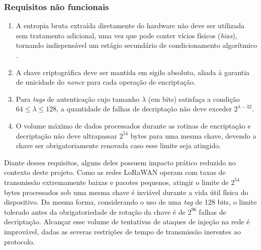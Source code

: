 \subsubsection{Requisitos não funcionais}

\begin{enumerate}
    \item[RNF1.] A entropia bruta extraída diretamente do hardware não deve ser utilizada sem tratamento adicional, uma vez que pode conter vícios físicos (\textit{bias}), tornando indispensável um estágio secundário de condicionamento algorítmico \cite{turan2018nist90b}.

    \item[RNF2.] A chave criptográfica deve ser mantida em sigilo absoluto, aliada à garantia de unicidade do \textit{nonce} para cada operação de encriptação.

    \item[RNF3.] Para \textit{tags} de autenticação cujo tamanho $\lambda$ (em bits) satisfaça a condição $64 \leq \lambda \leq 128$, a quantidade de falhas de decriptação não deve exceder $2^{\lambda - 32}$.

    \item[RNF4.] O volume máximo de dados processados durante as rotinas de encriptação e decriptação não deve ultrapassar $2^{54}$ bytes para uma mesma chave, devendo a chave ser obrigatoriamente renovada caso esse limite seja atingido.
\end{enumerate}

Diante desses requisitos, alguns deles possuem impacto prático reduzido no contexto deste projeto. Como as redes LoRaWAN operam com taxas de transmissão extremamente baixas e pacotes pequenos, atingir o limite de $2^{54}$ bytes processados sob uma mesma chave é inviável durante a vida útil física do dispositivo. Da mesma forma, considerando o uso de uma \textit{tag} de 128 bits, o limite tolerado antes da obrigatoriedade de rotação da chave é de $2^{96}$ falhas de decriptação. Alcançar esse volume de tentativas de ataques de injeção na rede é improvável, dadas as severas restrições de tempo de transmissão inerentes ao protocolo.
